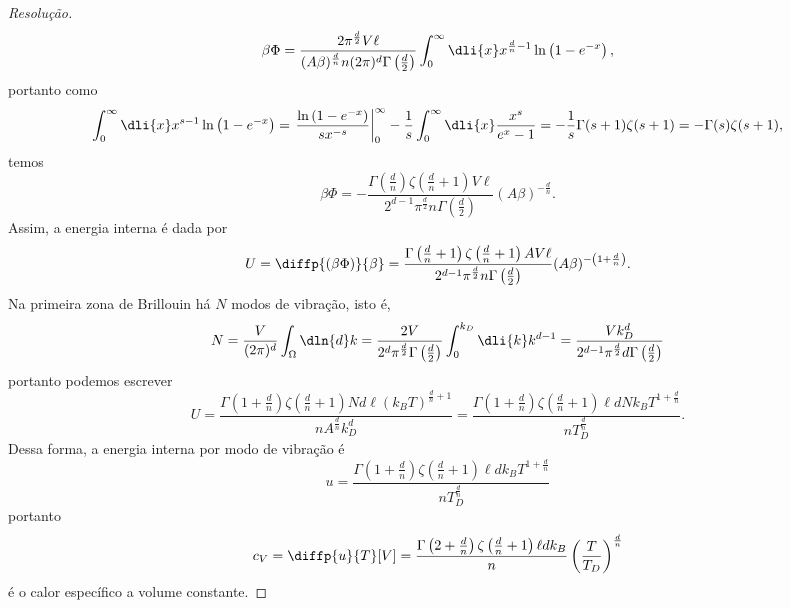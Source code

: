 \begin{proof}[Resolução]
\begin{equation*}
        \beta \Phi = \frac{2 \pi^{\frac{d}{2}} V \ell}{(A \beta)^{\frac{d}{n}}n(2\pi)^d \Gamma\left(\frac{d}{2}\right)} \int_0^{\infty} \dli{x} x^{\frac{d}{n} - 1}\ln\left(1 - e^{-x}\right),
    \end{equation*}
    portanto como
    \begin{equation*}
        \int_0^\infty \dli{x} x^{s - 1} \ln\left(1 - e^{-x}\right) = \left.\frac{\ln\left(1- e^{-x}\right)}{s x^{-s}}\right|_0^\infty - \frac1s\int_0^\infty \dli{x} \frac{x^{s}}{e^x - 1} = -\frac1s \Gamma(s + 1)\zeta(s + 1) = -\Gamma(s) \zeta(s+1),
    \end{equation*}
    temos
    \begin{equation*}
        \beta \Phi = -\frac{\Gamma\left(\frac{d}{n}\right) \zeta\left(\frac{d}{n} + 1\right) V \ell}{2^{d-1} \pi^{\frac{d}{2}} n\Gamma\left(\frac{d}{2}\right)}(A \beta)^{-\frac{d}{n}}.
    \end{equation*}
    Assim, a energia interna é dada por
    \begin{equation*}
        U = \diffp{(\beta \Phi)}{\beta} = \frac{ \Gamma\left(\frac{d}{n}+1\right) \zeta\left(\frac{d}{n} + 1\right) A V \ell}{2^{d-1} \pi^{\frac{d}{2}}n\Gamma\left(\frac{d}{2}\right)}(A \beta)^{-\left(1 +\frac{d}{n}\right)}.
    \end{equation*}
    Na primeira zona de Brillouin há \(N\) modos de vibração, isto é,
    \begin{equation*}
        N = \frac{V}{(2\pi)^d} \int_{\Omega} \dln{d}k = \frac{2V}{2^d\pi^{\frac{d}{2}}\Gamma\left(\frac{d}{2}\right)} \int_{0}^{k_D} \dli{k} k^{d-1} = \frac{V k_D^{d}}{2^{d-1}\pi^{\frac{d}{2}} d\Gamma\left(\frac{d}{2}\right)}
    \end{equation*}
    portanto podemos escrever
    \begin{equation*}
        U =  \frac{\Gamma\left(1 + \frac{d}{n}\right)  \zeta\left(\frac{d}{n} + 1\right)N d \ell (k_B T)^{\frac{d}{n} + 1}}{n A^{\frac{d}{n}} k_D^d} = \frac{\Gamma\left(1 + \frac{d}{n}\right)  \zeta\left(\frac{d}{n} + 1\right)\ell d N k_B T^{1 + \frac{d}{n}}}{n T_D^{\frac{d}{n}}}.
    \end{equation*}
    Dessa forma, a energia interna por modo de vibração é
    \begin{equation*}
        u = \frac{\Gamma\left(1 + \frac{d}{n}\right)  \zeta\left(\frac{d}{n} + 1\right)\ell d k_B T^{1 + \frac{d}{n}}}{n T_D^{\frac{d}{n}}}
    \end{equation*}
    portanto
    \begin{equation*}
        c_V = \diffp{u}{T}[V] =  \frac{\Gamma\left(2 + \frac{d}{n}\right) \zeta\left(\frac{d}{n} + 1\right)\ell d k_B}{n} \left(\frac{T}{T_D}\right)^{\frac{d}{n}}
    \end{equation*}
    é o calor específico a volume constante.
\end{proof}
